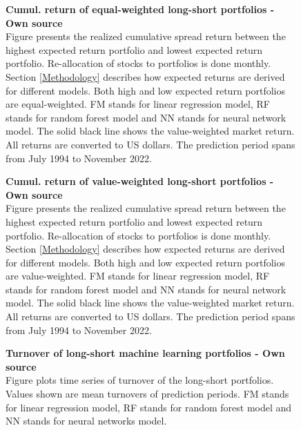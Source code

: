 \documentclass[12pt]{article}
\begin{document}
\begin{appendices}
\begin{figure}[H]
\centering
\caption[Cumulative return of equal-weighted long-short portfolios]{\textbf{Cumul. return of equal-weighted long-short portfolios \textnormal{- Own source}}\\ Figure presents the realized cumulative spread return between the highest expected return portfolio and lowest expected return portfolio. Re-allocation of stocks to portfolios is done monthly. Section \ref{Methodology} describes how expected returns are derived for different models. Both high and low expected return portfolios are equal-weighted. FM stands for linear regression model, RF stands for random forest model and NN stands for neural network model. The solid black line shows the value-weighted market return. All returns are converted to US dollars. The prediction period spans from July 1994 to November 2022.}

\label{plot:cumul_ew_LS_portf_return}
\end{figure}

\begin{figure}[H]
\centering
\caption[Cumulative return of value-weighted long-short portfolios]{\textbf{Cumul. return of value-weighted long-short portfolios \textnormal{- Own source}}\\ Figure presents the realized cumulative spread return between the highest expected return portfolio and lowest expected return portfolio. Re-allocation of stocks to portfolios is done monthly. Section \ref{Methodology} describes how expected returns are derived for different models. Both high and low expected return portfolios are value-weighted. FM stands for linear regression model, RF stands for random forest model and NN stands for neural network model. The solid black line shows the value-weighted market return. All returns are converted to US dollars. The prediction period spans from July 1994 to November 2022.}

\label{plot:cumul_vw_LS_portf_return}
\end{figure}

\begin{figure}[H]
\centering
\caption[Turnover of long-short machine learning portfolios]{\textbf{Turnover of long-short machine learning portfolios \textnormal{- Own source}}\\ Figure plots time series of turnover of the long-short portfolios. Values shown are mean turnovers of prediction periods. FM stands for linear regression model, RF stands for random forest model and NN stands for neural networks model. }

\label{plot:Turnover}
\end{figure}


\end{appendices}
\end{document}
